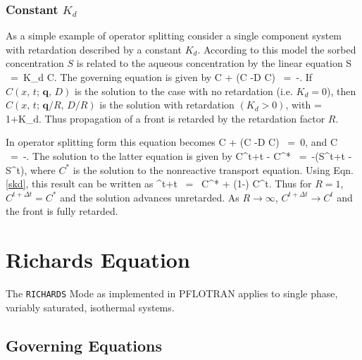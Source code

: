 \documentclass[12pt]{article}
\def\EQ#1\EN{\begin{equation}#1\end{equation}}
\newcommand{\eq}{\ =\ }
\newcommand{\p}{{\partial}}
\newcommand{\bnabla}{\boldsymbol{\nabla}}
\newcommand{\bq}{\boldsymbol{q}}
\begin{document}
\subsubsection{Constant $K_d$}

As a simple example of operator splitting consider a single component system with retardation described by a constant $K_d$. According to this model the sorbed concentration $S$ is related to the aqueous concentration by the linear equation
\EQ\label{skd}
S \eq K_d C.
\EN
The governing equation is given by
\EQ
\frac{\p}{\p t} \varphi C + \bnabla\cdot\big(\bq C -\varphi D \bnabla C\big) \eq -\frac{\p S}{\p t}.
\EN
If $C(x,\,t;\, \bq,\,D)$ is the solution to the case with no retardation (i.e. $K_d=0$), then $C(x,\,t;\, \bq/R,\,D/R)$ is the solution with retardation $(K_d>0)$,
with
\EQ
R = 1+K_d.
\EN
Thus propagation of a front is retarded by the retardation factor $R$.

In operator splitting form this equation becomes
\EQ
\frac{\p}{\p t} \varphi C + \bnabla\cdot\big(\bq C -\varphi D \bnabla C\big) \eq 0,
\EN
and
\EQ
\frac{d}{d t} \varphi C \eq -.
\EN
The solution to the latter equation is given by
\EQ
\varphi C^{t+\Delta t} - \varphi C^* \eq -\big(S^{t+\Delta t} - S^t\big),
\EN
where $C^*$ is the solution to the nonreactive transport equation. Using Eqn.\eqref{skd}, this result can be written as
\EQ
C^{t+\Delta t} \eq {} C^* + \left(1-\right) C^t.
\EN
Thus for $R=1$, $C^{t+\Delta t}=C^*$ and the solution advances unretarded. As $R\rightarrow\infty$, $C^{t+\Delta t} \rightarrow C^t$ and the front is fully retarded.



\section{Richards Equation}

The {\tt RICHARDS} Mode as implemented in PFLOTRAN applies to single phase, variably saturated, isothermal systems. 

\subsection{Governing Equations}
\end{document}
